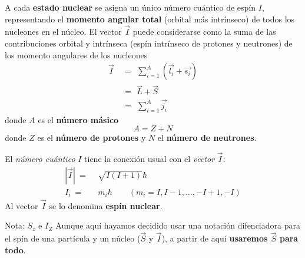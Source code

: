 A cada \textbf{estado nuclear} se asigna un único número cuántico de espín $I$, representando el \textbf{momento angular total} (orbital más intrínseco) de todos los nucleones en el núcleo. El vector $\vec{I}$ puede considerarse como la suma de las contribuciones orbital y intrínseca (espín intrínseco de protones y neutrones) de los momento angulares de los nucleones
\begin{equation} \label{ec_Hardware_NMR_I}
\begin{aligned} 
\vec{I} ~ & =  ~ \, \sum_{i=1}^A (\vec{l_i} +  \vec{s_i}) \nonumber \\
& = ~ \,  \vec{L} + \vec{S}  \\
& = ~ \, \sum_{i=1}^A \vec{j_i} \nonumber
\end{aligned}
\end{equation}
donde $A$ es el \textbf{número másico} 
	\begin{equation}
	A = Z + N 
	\end{equation}
donde $Z$ es el \textbf{número de protones} y $N$ el \textbf{número de neutrones}.

El \textit{número cuántico} $I$ tiene la conexión  usual con el \textit{vector} $\vec{I}$:
\begin{equation} 
\begin{aligned}
| \vec{I} | ~ = & ~\,  \sqrt{I(I+1)} \hbar \\
I_i ~ = & ~\, m_i \hbar \qquad (m_i = I, I-1, \dots, -I +1, -I)
\end{aligned}
\end{equation}
Al vector $\vec{I}$ se lo denomina \textbf{espín nuclear}.

	\begin{mybox_blue}{Nota: $S_z$ e $I_Z$}
	Aunque aquí hayamos decidido usar una notación difenciadora para el spín de una partícula 
	y un núcleo ($\vec{S}$ y $\vec{I}$), a partir de aquí \textbf{usaremos $\vec{S}$ para todo}.
	\end{mybox_blue}




